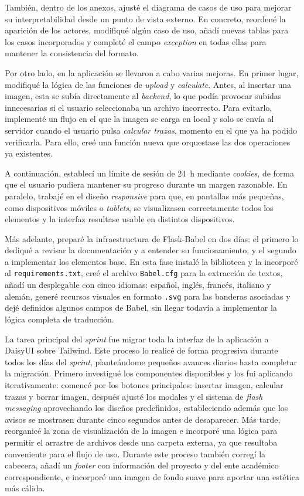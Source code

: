 También, dentro de los anexos, ajusté el diagrama de casos de uso para mejorar su interpretabilidad desde un punto de vista externo. En concreto, reordené la aparición de los actores, modifiqué algún caso de uso, añadí nuevas tablas para los casos incorporados y completé el campo \textit{exception} en todas ellas para mantener la consistencia del formato.

Por otro lado, en la aplicación se llevaron a cabo varias mejoras. En primer lugar, modifiqué la lógica de las funciones de \textit{upload} y \textit{calculate}. Antes, al insertar una imagen, esta se subía directamente al \textit{backend}, lo que podía provocar subidas innecesarias si el usuario seleccionaba un archivo incorrecto. Para evitarlo, implementé un flujo en el que la imagen se carga en local y solo se envía al servidor cuando el usuario pulsa \textit{calcular trazas}, momento en el que ya ha podido verificarla. Para ello, creé una función nueva que orquestase las dos operaciones ya existentes.

A continuación, establecí un límite de sesión de 24~h mediante \textit{cookies}, de forma que el usuario pudiera mantener su progreso durante un margen razonable. En paralelo, trabajé en el diseño \textit{responsive} para que, en pantallas más pequeñas, como dispositivos móviles o \textit{tablets}, se visualizasen correctamente todos los elementos y la interfaz resultase usable en distintos dispositivos.

Más adelante, preparé la infraestructura de Flask-Babel en dos días: el primero lo dediqué a revisar la documentación y a entender su funcionamiento, y el segundo a implementar los elementos base. En esta fase instalé la biblioteca y la incorporé al \texttt{requirements.txt}, creé el archivo \texttt{Babel.cfg} para la extracción de textos, añadí un desplegable con cinco idiomas: español, inglés, francés, italiano y alemán, generé recursos visuales en formato \texttt{.svg} para las banderas asociadas y dejé definidos algunos campos de Babel, sin llegar todavía a implementar la lógica completa de traducción.

La tarea principal del \textit{sprint} fue migrar toda la interfaz de la aplicación a DaisyUI sobre Tailwind. Este proceso lo realicé de forma progresiva durante todos los días del \textit{sprint}, planteándome pequeños avances diarios hasta completar la migración. Primero investigué los componentes disponibles y los fui aplicando iterativamente: comencé por los botones principales: insertar imagen, calcular trazas y borrar imagen, después ajusté los modales y el sistema de \textit{flash messaging} aprovechando los diseños predefinidos, estableciendo además que los avisos se mostrasen durante cinco segundos antes de desaparecer. Más tarde, reorganicé la zona de visualización de la imagen e incorporé una lógica para permitir el arrastre de archivos desde una carpeta externa, ya que resultaba conveniente para el flujo de uso. Durante este proceso también corregí la cabecera, añadí un \textit{footer} con información del proyecto y del ente académico correspondiente, e incorporé una imagen de fondo suave para aportar una estética más cálida.

